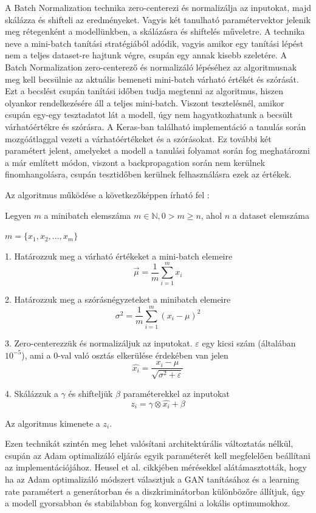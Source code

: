 A Batch Normalization technika zero-centerezi és normalizálja az inputokat, majd skálázza és shifteli az eredményeket. Vagyis két tanulható paramétervektor jelenik meg rétegenként a modellünkben, a skálázásra és shiftelés műveletre. A technika neve a mini-batch tanítási stratégiából adódik, vagyis amikor egy tanítási lépést nem a teljes dataset-re hajtunk végre, csupán egy annak kisebb szeletére. A Batch Normalization zero-centerező és normalizáló lépéséhez az algoritmusnak meg kell becsülnie az aktuális bemeneti mini-batch várható értékét és szórását. Ezt a becslést csupán tanítási időben tudja megtenni az algoritmus, hiszen olyankor rendelkezésére áll a teljes mini-batch. Viszont tesztelésnél, amikor csupán egy-egy tesztadatot lát a modell, úgy nem hagyatkozhatunk a becsült várhatóértékre és szórásra. A Keras-ban található implementáció a tanulás során mozgóátlaggal vezeti a várhatóértékeket és a szórásokat. Ez további két paramétert jelent, amelyeket a modell a tanulási folyamat során fog meghatározni a már említett módon, viszont a backpropagation során nem kerülnek finomhangolásra, csupán tesztidőben kerülnek felhasználásra ezek az értékek.

Az algoritmus működése a következőképpen írható fel \cite{geron2019hands}:

Legyen $m$ a minibatch elemszáma $m \in \mathbb{N}, 0 > m \ge n$, ahol $n$ a dataset elemszáma

$m = \{x_1, x_2, \ldots, x_m \}$ 

1. Határozzuk meg a várható értékeket a mini-batch elemeire
$$ \vec{\mu} = \frac{1}{m} \sum_{i=1}^{m} x_i $$

2. Határozzuk meg a szórásnégyzeteket a minibatch elemeire
$$ \sigma^2 = \frac{1}{m} \sum_{i=1}^{m} (x_i - \mu)^2 $$

3. Zero-centerezzük és normalizáljuk az inputokat. $\varepsilon$ egy kicsi szám (általában $10^{-5}$), ami a 0-val való osztás elkerülése érdekében van jelen
$$ \hat{x_i} = \frac{x_i - \mu}{\sqrt{\sigma^2 + \varepsilon}} $$

4. Skálázzuk a $\gamma$ és shifteljük $\beta$ paraméterekkel az inputokat
$$ z_i = \gamma \otimes \hat{x_i} + \beta$$

Az algoritmus kimenete a $z_i$.


Ezen technikát szintén meg lehet valósítani architektúrális változtatás nélkül, csupán az Adam optimalizáló eljárás egyik paraméterét kell megfelelően beállítani az implementációjához.
Heusel et al. \cite{heusel2017gans} cikkjében mérésekkel alátámasztották, hogy ha az Adam optimalizáló módszert választjuk a GAN tanításához és a learning rate paramétert a generátorban és a diszkriminátorban különbözőre állítjuk, úgy a modell gyorsabban és stabilabban fog konvergálni a lokális optimumokhoz.

